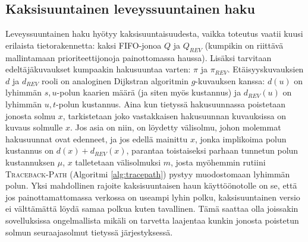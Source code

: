 \documentclass[finnish]{tktltiki2}
\theoremstyle{definition}
\theoremstyle{remark}
\begin{document}
\subsection{Kaksisuuntainen leveyssuuntainen haku}
Leveyssuuntainen haku hyötyy kaksisuuntaisuudesta, vaikka toteutus vaatii kuusi erilaista tietorakennetta: kaksi FIFO-jonoa $Q$ ja $Q_{REV}$ (kumpikin on riittävä mallintamaan prioriteettijonoja painottomassa haussa). Lisäksi tarvitaan edeltäjäkuvaukset kumpaakin hakusuuntaa varten: $\pi$ ja $\pi_{REV}$. Etäisyyskuvauksien $d$ ja $d_{REV}$ rooli on analoginen Dijkstran algoritmin $g$-kuvauksen kanssa: $d(u)$ on lyhimmän $s, u$-polun kaarien määrä (ja siten myös kustannus) ja $d_{REV}(u)$ on lyhimmän $u, t$-polun kustannus. Aina kun tietyssä hakusuunnassa poistetaan jonosta solmu $x$, tarkistetaan joko vastakkaisen hakusuunnan kuvauksissa on kuvaus solmulle $x$. Jos asia on niin, on löydetty välisolmu, johon molemmat hakusuunnat ovat edenneet, ja jos edellä mainittu $x$, jonka implikoima polun kustannus on $d(x) + d_{REV}(x)$, parantaa toistaiseksi parhaan tunnetun polun kustannuksen $\mu$, $x$ talletetaan välisolmuksi $m$, josta myöhemmin rutiini \textsc{Traceback-Path} (Algoritmi \ref{alg:tracepath}) pystyy muodostomaan lyhimmän polun. Yksi mahdollinen rajoite kaksisuuntaisen haun käyttöönotolle on se, että jos painottamattomassa verkossa on useampi lyhin polku, kaksisuuntainen versio ei välttämättä löydä samaa polkua kuten tavallinen. Tämä saattaa olla joissakin sovelluksissa ongelmallista mikäli on tarvetta laajentaa kunkin jonosta poistetun solmun seuraajasolmut tietyssä järjestyksessä.
\end{document}
